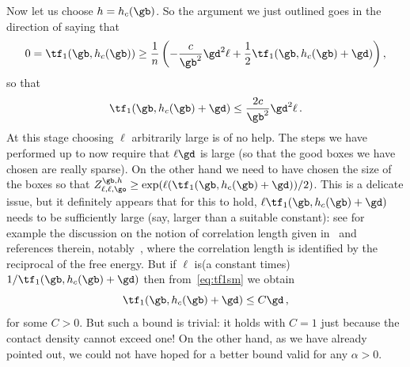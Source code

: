 Now let us choose $h=h_c(\gb)$. So the argument we just outlined goes in the direction of saying that
\begin{equation}
0 = \tf_1(\gb, h_c(\gb)) \ge \frac{1}{n} \left(-\frac{c}{\gb^2} \gd ^2 \ell+ \frac{1}{2} \tf_1(\gb, h_c(\gb)+ \gd) \right),
\end{equation}
so that
\begin{equation}
\tf_1(\gb, h_c(\gb)+ \gd)\le \frac{2c}{\gb^2} \gd ^2 \ell\,.\label{eq:tf1sm}
\end{equation}
At this stage choosing $\ell$ arbitrarily large is of no help. The steps we have performed up to now require that $ \ell \gd$ is large (so that the good boxes we have chosen are really sparse). On the other hand we need to have chosen the size of the boxes so that $Z_{\ell, \ell, \go}^{\gb, h} \ge \exp(\ell (\tf_1(\gb, h_c(\gb)+ \gd))/2)$. This is a delicate issue, but it definitely appears that for this to hold, $\ell \tf_1(\gb, h_c(\gb)+ \gd)$ needs to be sufficiently large (say, larger than a suitable constant): see for example the discussion on the notion of correlation length given in~\cite[Chapter~2]{cf:G} and references therein, notably~\cite{cf:GTalea}, where the correlation length is identified by the reciprocal of the free energy. But if $\ell$ is\linebreak(a constant times) $1/\tf_1(\gb, h_c(\gb)+ \gd)$ then from~\eqref{eq:tf1sm} we obtain
\begin{equation}\label{eq:trivb}
\tf_1(\gb, h_c(\gb)+ \gd)\le C \gd\,,
\end{equation}
for some $C>0$. But such a bound is trivial: it holds with $C=1$ just because the contact density cannot exceed one! On the other hand, as we have already pointed out, we could not have hoped for a better bound valid for any $\alpha>0$.

